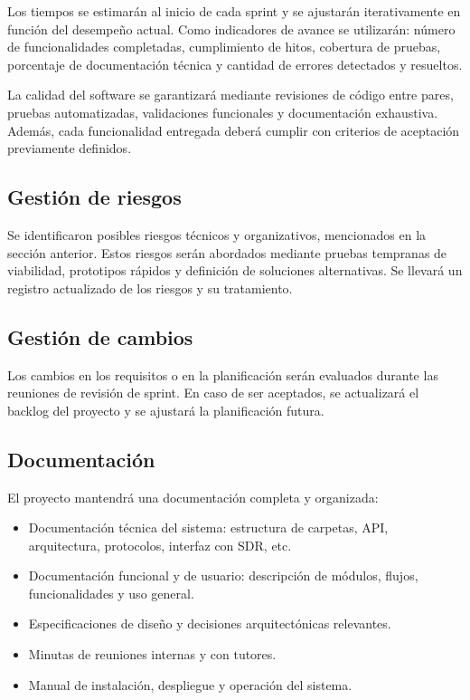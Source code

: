 Los tiempos se estimarán al inicio de cada sprint y se ajustarán iterativamente en función del desempeño actual. Como indicadores de avance se utilizarán: número de funcionalidades completadas, cumplimiento de hitos, cobertura de pruebas, porcentaje de documentación técnica y cantidad de errores detectados y resueltos.

La calidad del software se garantizará mediante revisiones de código entre pares, pruebas automatizadas, validaciones funcionales y documentación exhaustiva. Además, cada funcionalidad entregada deberá cumplir con criterios de aceptación previamente definidos.

\subsection*{Gestión de riesgos}

Se identificaron posibles riesgos técnicos y organizativos, mencionados en la sección anterior. Estos riesgos serán abordados mediante pruebas tempranas de viabilidad, prototipos rápidos y definición de soluciones alternativas. Se llevará un registro actualizado de los riesgos y su tratamiento.

\subsection*{Gestión de cambios}

Los cambios en los requisitos o en la planificación serán evaluados durante las reuniones de revisión de sprint. En caso de ser aceptados, se actualizará el backlog del proyecto y se ajustará la planificación futura.

\subsection*{Documentación}

El proyecto mantendrá una documentación completa y organizada:

\begin{itemize}
    \item Documentación técnica del sistema: estructura de carpetas, API, arquitectura, protocolos, interfaz con SDR, etc.
    \item Documentación funcional y de usuario: descripción de módulos, flujos, funcionalidades y uso general.
    \item Especificaciones de diseño y decisiones arquitectónicas relevantes.
    \item Minutas de reuniones internas y con tutores.
    \item Manual de instalación, despliegue y operación del sistema.
\end{itemize}

